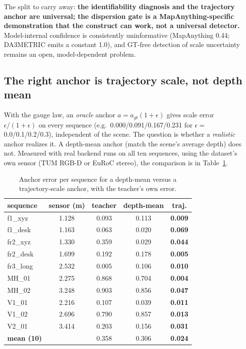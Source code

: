 The split to carry away: \textbf{the identifiability diagnosis and the trajectory
anchor are universal; the dispersion gate is a MapAnything-specific demonstration
that the construct can work, not a universal detector.} Model-internal confidence
is consistently uninformative (MapAnything 0.44; DA3METRIC emits a constant 1.0),
and GT-free detection of scale uncertainty remains an open, model-dependent
problem.

\subsection{The right anchor is trajectory scale, not depth mean}
\label{sec:anchor}

With the gauge law, an \emph{oracle} anchor $a=a_{gt}(1+\epsilon)$ gives scale
error $\epsilon/(1+\epsilon)$ on every sequence (e.g.\ 0.000/0.091/0.167/0.231
for $\epsilon={}$0.0/0.1/0.2/0.3), independent of the scene. The question is
whether a \emph{realistic} anchor realizes it. A depth-mean anchor (match the
scene's average depth) does not. Measured with real backend runs on all ten
sequences, using the dataset's own sensor (TUM RGB-D or EuRoC stereo), the
comparison is in Table~\ref{tab:anchor}.

\begin{table}[t]
\centering
\caption{Anchor error per sequence for a depth-mean versus a trajectory-scale
anchor, with the teacher's own error.}
\label{tab:anchor}
\footnotesize
\setlength{\tabcolsep}{4pt}
\begin{tabular}{@{}lcccc@{}}
\toprule
sequence & sensor (m) & teacher & depth-mean & traj. \\
\midrule
f1\_xyz & 1.128 & 0.093 & 0.113 & \textbf{0.009} \\
f1\_desk & 1.163 & 0.063 & 0.020 & \textbf{0.069} \\
fr2\_xyz & 1.330 & 0.359 & 0.029 & \textbf{0.044} \\
fr2\_desk & 1.699 & 0.192 & 0.178 & \textbf{0.005} \\
fr3\_long & 2.532 & 0.005 & 0.106 & \textbf{0.010} \\
MH\_01 & 2.275 & 0.868 & 0.704 & \textbf{0.004} \\
MH\_02 & 3.248 & 0.903 & 0.856 & \textbf{0.047} \\
V1\_01 & 2.216 & 0.107 & 0.039 & \textbf{0.011} \\
V1\_02 & 2.696 & 0.790 & 0.857 & \textbf{0.013} \\
V2\_01 & 3.414 & 0.203 & 0.156 & \textbf{0.031} \\
\midrule
\textbf{mean (10)} & & 0.358 & 0.306 & \textbf{0.024} \\
\bottomrule
\end{tabular}
\end{table}

